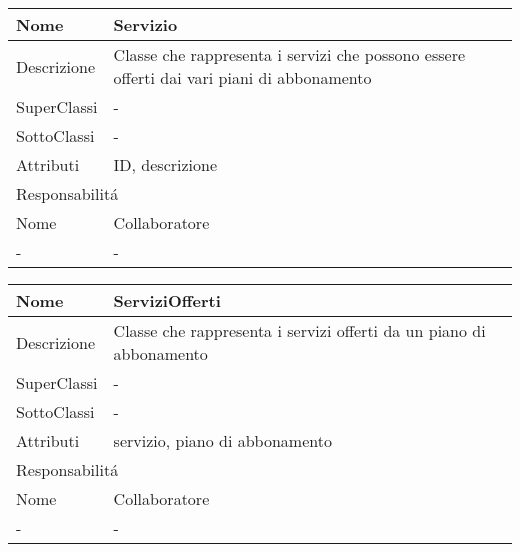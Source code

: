 \begin{center}
    \begin{longtable}{ |p{3cm}|p{3cm}|p{3cm}|p{3cm}| }
        \hline
        Nome & \multicolumn{3}{|p{9cm}|}{Servizio} \\\hline
        Descrizione & \multicolumn{3}{|p{9cm}|}{Classe che rappresenta i servizi che possono essere offerti dai vari piani di abbonamento} \\\hline
        SuperClassi & \multicolumn{3}{|p{9cm}|}{-} \\\hline
        SottoClassi & \multicolumn{3}{|p{9cm}|}{-} \\\hline
        Attributi & \multicolumn{3}{|p{9cm}|}{ID, descrizione} \\\hline
        \multicolumn{4}{|p{12cm}|}{Responsabilit\'a} \\\hline
        \multicolumn{2}{|p{6cm}|}{Nome} & \multicolumn{2}{|p{6cm}|}{Collaboratore} \\\hline
        \multicolumn{2}{|p{6cm}|}{-} & \multicolumn{2}{|p{6cm}|}{-} \\\hline
    \end{longtable}
\end{center}

\begin{center}
    \begin{longtable}{ |p{3cm}|p{3cm}|p{3cm}|p{3cm}| }
        \hline
        Nome & \multicolumn{3}{|p{9cm}|}{ServiziOfferti} \\\hline
        Descrizione & \multicolumn{3}{|p{9cm}|}{Classe che rappresenta i servizi offerti da un piano di abbonamento} \\\hline
        SuperClassi & \multicolumn{3}{|p{9cm}|}{-} \\\hline
        SottoClassi & \multicolumn{3}{|p{9cm}|}{-} \\\hline
        Attributi & \multicolumn{3}{|p{9cm}|}{servizio, piano di abbonamento} \\\hline
        \multicolumn{4}{|p{12cm}|}{Responsabilit\'a} \\\hline
        \multicolumn{2}{|p{6cm}|}{Nome} & \multicolumn{2}{|p{6cm}|}{Collaboratore} \\\hline
        \multicolumn{2}{|p{6cm}|}{-} & \multicolumn{2}{|p{6cm}|}{-} \\\hline
    \end{longtable}
\end{center}

